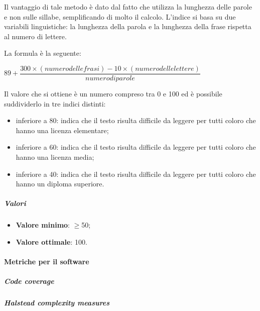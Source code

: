 Il vantaggio di tale metodo è dato dal fatto che utilizza la lunghezza delle parole e non sulle sillabe, semplificando di molto il calcolo. L'indice si basa su due variabili linguistiche: la lunghezza della parola e la lunghezza della frase rispetta al numero di lettere.

La formula è la seguente:
\begin{center}
$89+\dfrac{300\times(numerodellefrasi)-10\times(numero delle lettere)}{numero di parole}$
\end{center}
Il valore che si ottiene è un numero compreso tra 0 e 100 ed è possibile suddividerlo in tre indici distinti:
\begin{itemize}
	\item inferiore a 80: indica che il testo risulta difficile da leggere per tutti coloro che hanno una licenza elementare;
	\item inferiore a 60: indica che il testo risulta difficile da leggere per tutti coloro che hanno una licenza media;
	\item inferiore a 40: indica che il testo risulta difficile da leggere per tutti coloro che hanno un diploma superiore.
\end{itemize}
\subparagraph{Valori}
\begin{itemize}
	\item \textbf{Valore minimo}: $\geq$50;
	\item \textbf{Valore ottimale}: 100.
\end{itemize}
\paragraph{Metriche per il software}
\subparagraph*{Code coverage}
\subparagraph*{Halstead complexity measures}
